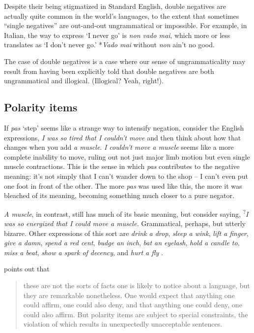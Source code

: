 \begin{tcolorbox}[title=The normality of double negatives, colback=white, parbox] \label{sec:double-negs}
\setlength{\parindent}{1.5em}
    \noindent Despite their being stigmatized in Standard English, double negatives are actually quite common in the world's languages, to the extent that sometimes ``single negatives'' are out-and-out ungrammatical or impossible. For example, in Italian, the way to express `I never go' is \textit{non vado mai}, which more or less translates as `I don't never go.' *\textit{Vado mai} without \textit{non} ain't no good.
    
    The case of double negatives is a case where our sense of ungrammaticality may result from having been explicitly told that double negatives are both ungrammatical and illogical. (Illogical? Yeah, right!). 
\end{tcolorbox}


\subsection{Polarity items}

If \textit{pas} `step' seems like a strange way to intensify negation, consider the English expressions,  \textit{I was so tired that I couldn't move} and then think about how that changes when you add \textit{a muscle}. \textit{I couldn't move a muscle} seems like a more complete inability to move, ruling out not just major limb motion but even single muscle contractions. This is the sense in which \textit{pas} contributes to the negative meaning: it's not simply that I can't wander down to the shop -- I can't even put one foot in front of the other. The more \textit{pas} was used like this, the more it was bleached of its meaning, becoming something much closer to a pure negator.

\textit{A muscle}, in contrast, still has much of its basic meaning, but consider saying, \textsuperscript{?}\textit{I was so energized that I could move a muscle.} Grammatical, perhaps, but utterly bizarre. Other expressions of this sort are \textit{drink a drop}, \textit{sleep a wink}, \textit{lift a finger}, \textit{give a damn}, \textit{spend a red cent}, \textit{budge an inch}, \textit{bat an eyelash}, \textit{hold a candle to}, \textit{miss a beat}, \textit{show a spark of decency}, and \textit{hurt a fly} \citep[24]{Israel2011}.

\citet[3]{Israel2011} points out that

\begin{quote}
    these are not the sorts of facts one is likely to notice about a language, but they are remarkable nonetheless. One would expect that anything one could affirm, one could also deny, and that anything one could deny, one could also affirm. But polarity items are subject to special constraints, the violation of which results in unexpectedly unacceptable sentences.
\end{quote}


